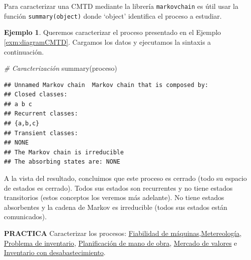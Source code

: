 \documentclass[
]{book}
\newenvironment{Shaded}{\begin{snugshade}}{\end{snugshade}}
\newcommand{\CommentTok}[1]{\textcolor[rgb]{0.56,0.35,0.01}{\textit{#1}}}
\newcommand{\FunctionTok}[1]{\textcolor[rgb]{0.00,0.00,0.00}{#1}}
\newcommand{\NormalTok}[1]{#1}
\newenvironment{bluebox}{
  \definecolor{shadecolor}{rgb}{176, 196, 222}  
  \color{black}
  \begin{shaded}}
 {\end{shaded}}
\newenvironment{whitebox}{
  \definecolor{shadecolor}{rgb}{255, 255, 255}  
  \color{black}
  \begin{shaded}}
 {\end{shaded}}
\theoremstyle{definition}
\theoremstyle{definition}
\newtheorem{example}{Ejemplo}[chapter]
\theoremstyle{definition}
\theoremstyle{definition}
\theoremstyle{remark}
\begin{document}
\begin{whitebox}
Para caracterizar una CMTD mediante la librería \texttt{markovchain} es útil usar la función \texttt{summary(object)} donde `object' identifica el proceso a estudiar.

\end{whitebox}

\begin{example}
\protect\hypertarget{exm:summary-markovchain}{}\label{exm:summary-markovchain}Queremos caracterizar el proceso presentado en el Ejemplo \ref{exm:diagramCMTD}. Cargamos los datos y ejecutamos la sintaxis a continuación.

\begin{Shaded}
\begin{Highlighting}[]
\CommentTok{\# Caracterización}
\FunctionTok{summary}\NormalTok{(proceso)}
\end{Highlighting}
\end{Shaded}

\begin{verbatim}
## Unnamed Markov chain  Markov chain that is composed by: 
## Closed classes: 
## a b c 
## Recurrent classes: 
## {a,b,c}
## Transient classes: 
## NONE 
## The Markov chain is irreducible 
## The absorbing states are: NONE
\end{verbatim}

A la vista del resultado, concluimos que este proceso es cerrado (todo su espacio de estados es cerrado). Todos sus estados son recurrentes y no tiene estados transitorios (estos conceptos los veremos más adelante). No tiene estados absorbentes y la cadena de Markov es irreducible (todos sus estados están comunicados).
\end{example}

\begin{bluebox}
\textbf{PRACTICA} Caracterizar los procesos: \protect\hyperlink{fiabilidad}{Fiabilidad de máquinas},\protect\hyperlink{meteo}{Metereología}, \protect\hyperlink{inventario}{Problema de inventario}, \protect\hyperlink{planificacion}{Planificación de mano de obra}, \protect\hyperlink{mercadovalores}{Mercado de valores} e \protect\hyperlink{inventario2}{Inventario con desabastecimiento}.

\end{bluebox}
\end{document}
